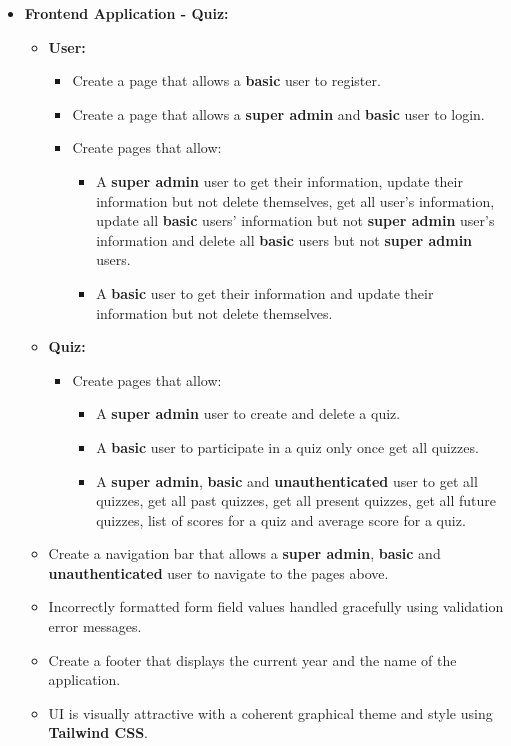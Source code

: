 \documentclass{article}
\begin{document}
\begin{itemize}
	\item \textbf{Frontend Application - Quiz:}
	\begin{itemize}
		\item \textbf{User:}
		\begin{itemize}
			\item Create a page that allows a \textbf{basic} user to register.
			\item Create a page that allows a \textbf{super admin} and \textbf{basic} user to login.
			\item Create pages that allow:
			\begin{itemize}
				\item A \textbf{super admin} user to get their information, update their information but not delete themselves, get all user's information, update all \textbf{basic} users' information but not \textbf{super admin} user's information and delete all \textbf{basic} users but not \textbf{super admin} users.
				\item A \textbf{basic} user to get their information and update their information but not delete themselves.
			\end{itemize}
		\end{itemize}
		\item \textbf{Quiz:}
		\begin{itemize}
			\item Create pages that allow:
			\begin{itemize}
				\item A \textbf{super admin} user to create and delete a quiz.
				\item A \textbf{basic} user to participate in a quiz only once get all quizzes.
				\item A \textbf{super admin}, \textbf{basic} and \textbf{unauthenticated} user to get all quizzes, get all past quizzes, get all present quizzes, get all future quizzes, list of scores for a quiz and average score for a quiz.
			\end{itemize}
		\end{itemize}
		\item Create a navigation bar that allows a \textbf{super admin}, \textbf{basic} and \textbf{unauthenticated} user to navigate to the pages above.
		\item Incorrectly formatted form field values handled gracefully using validation error messages.
		\item Create a footer that displays the current year and the name of the application.
		\item UI is visually attractive with a coherent graphical theme and style using \textbf{Tailwind CSS}.
	\end{itemize}


\end{itemize}
\end{document}
